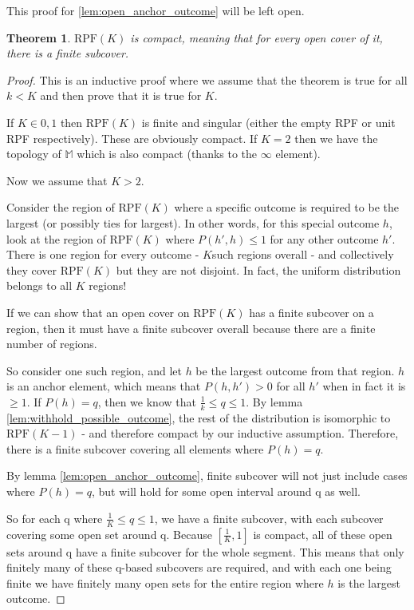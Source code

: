 \documentclass[twoside]{article}
\theoremstyle{plain}%
\newtheorem{theorem}{Theorem}[section]
\theoremstyle{definition}
\theoremstyle{remark}
\begin{document}
This proof for \ref{lem:open_anchor_outcome} will be left open.

\begin{theorem}
\(\text{RPF}(K)\) is \textit{compact}, meaning that for every open cover of it, there is a finite subcover.
\end{theorem}

\begin{proof}
This is an inductive proof where we assume that the theorem is true for all \(k < K\) and then prove that it is true for \(K\).

If \(K \in {0, 1}\) then \(\text{RPF}(K)\) is finite and singular (either the empty RPF or unit RPF respectively). These are obviously compact. If \(K = 2\) then we have the topology of \(\mathbb{M}\) which is also compact (thanks to the \(\infty\) element).

Now we assume that \(K > 2\).

Consider the region of \(\text{RPF}(K)\) where a specific outcome is required to be the largest (or possibly ties for largest). In other words, for this special outcome \(h\), look at the region of \(\text{RPF}(K)\) where \(P(h', h) \leq  1\) for any other outcome \(h'\). There is one region for every outcome - \(K\)such regions overall - and collectively they cover \(\text{RPF}(K)\) but they are not disjoint. In fact, the uniform distribution belongs to all \(K\) regions!

If we can show that an open cover on \(\text{RPF}(K)\) has a finite subcover on a region, then it must have a finite subcover overall because there are a finite number of regions.

So consider one such region, and let \(h\) be the largest outcome from that region. \(h\) is an anchor element, which means that \(P(h, h') > 0\) for all \(h'\) when in fact it is \(\geq 1\). If \(P(h) = q\), then we know that \(\frac{1}{k} \leq q \leq 1\). By lemma \ref{lem:withhold_possible_outcome}, the rest of the distribution is isomorphic to \(\text{RPF}(K - 1)\) - and therefore compact by our inductive assumption. Therefore, there is a finite subcover covering all elements where \(P(h) = q\).

By lemma \ref{lem:open_anchor_outcome}, finite subcover will not just include cases where \(P(h) = q\), but will hold for some open interval around q as well.

So for each q where \(\frac{1}{K} \leq q \leq 1\), we have a finite subcover, with each subcover covering some open set around q. Because \([\frac{1}{K}, 1]\) is compact, all of these open sets around q have a finite subcover for the whole segment. This means that only finitely many of these q-based subcovers are required, and with each one being finite we have finitely many open sets for the entire region where \(h\) is the largest outcome.
\end{proof}
\end{document}
